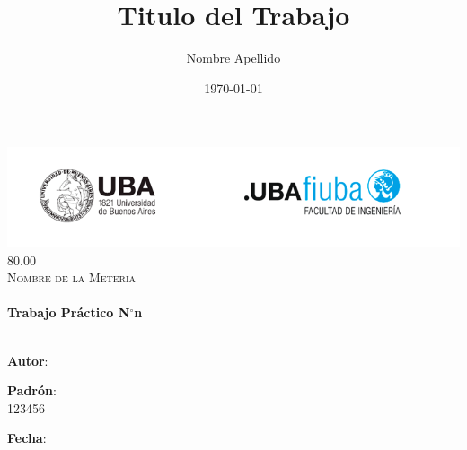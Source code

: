\documentclass[12pt]{article}
\title{Titulo del Trabajo}	    				%
\author{Nombre Apellido}					%
\date{\today}								%
\makeatletter
\newcommand{\padron}{123456}   				%
\newcommand{\tpnumber}{n}       				%
\newcommand{\codigo}{80.00}					%
\newcommand{\materia}{Nombre de la Meteria}	%
\let\thetitle\@title
\let\theauthor\@author
\let\thedate\@date
\makeatother
\begin{document}
\begin{titlepage}
    \includegraphics[width = \linewidth]{img/logofiuba.png}\\[1.0 cm]	    %
    \centering
	\textsc{\Large \codigo}\\[0.2 cm] 
	\textsc{\large \materia}\\[4 cm]
	\textcolor{cyan}{{\fontsize{40}{60}\selectfont \bfseries \thetitle}}\\[0.5cm]
	{ \Large \bfseries Trabajo Práctico N$^\circ$\tpnumber}\\[5cm]
	
	
    \noindent\makebox[\linewidth]{\rule{\textwidth}{0.4pt}}\\[0.5cm]
    \begin{minipage}{.4\textwidth}
    \textbf{Autor}:\\
    \theauthor
    \end{minipage}%
    \begin{minipage}{.4\textwidth}
    \textbf{Padrón}:\\
    \padron
    \end{minipage}%
    \begin{minipage}{.2\textwidth}
    \textbf{Fecha}:\\
    \thedate
    \end{minipage}
 
	\vfill
\end{titlepage}
\end{document}
